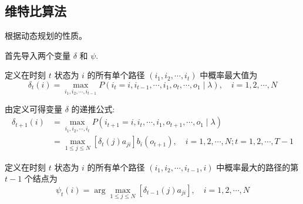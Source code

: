 \subsection{维特比算法}

根据动态规划的性质。 

首先导入两个变量 $ \delta $ 和 $ \psi $. 

\begin{definition}
    定义在时刻 $ t $ 状态为 $ i $ 的所有单个路径 $ \left(i_{1}, i_{2}, \cdots, i_{t}\right) $ 中概率最大值为
$$
\delta_{t}(i)=\max _{i_1, i_{2}, \cdots, i_{t-1}} P\left(i_{t}=i, i_{t-1}, \cdots, i_{1}, o_{t}, \cdots, o_{1} \mid \lambda\right), \quad i=1,2, \cdots, N
$$
\end{definition}

\begin{corollary}
   由定义可得变量 $ \delta $ 的递推公式:
$$
\begin{aligned}
\delta_{t+1}(i) &=\max _{i_1, i_2, \cdots, i_{t}} P\left(i_{t+1}=i, i_{t}, \cdots, i_{1}, o_{t+1}, \cdots, o_{1} \mid \lambda\right) \\
&=\max _{1 \leqslant j \leqslant N}\left[\delta_{t}(j) a_{j i}\right] b_{i}\left(o_{t+1}\right), \quad i=1,2, \cdots, N ; t=1,2, \cdots, T-1
\end{aligned}
$$ 
\end{corollary}

\begin{definition}
    定义在时刻 $ t $ 状态为 $ i $ 的所有单个路径 $ \left(i_{1}, i_{2}, \cdots, i_{t-1}, i\right) $ 中概率最大的路径的第 $ t-1 $ 个结点为
$$
\psi_{t}(i)=\arg \max _{1 \leqslant j \leqslant N}\left[\delta_{t-1}(j) a_{j i}\right], \quad i=1,2, \cdots, N
$$
\end{definition}



